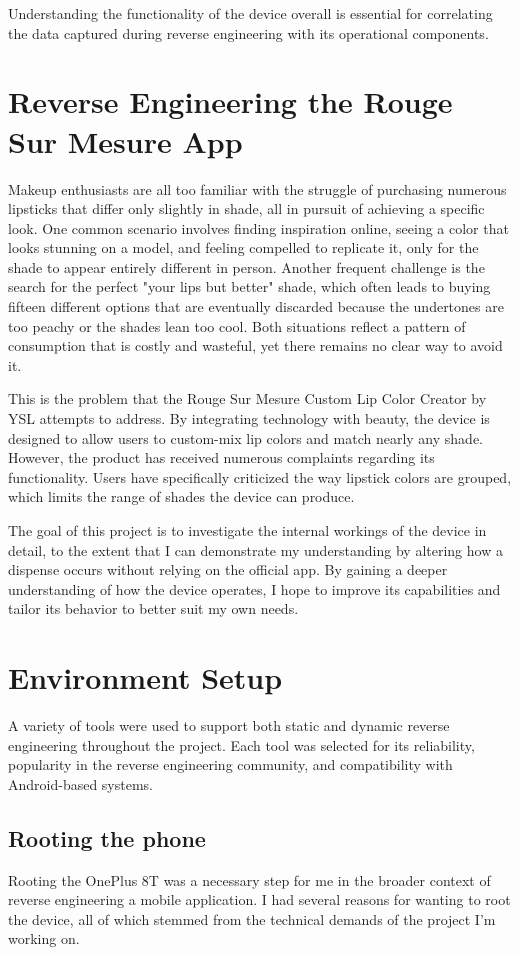 Understanding the functionality of the device overall is essential for correlating the data captured during reverse engineering with its operational components.

\section{Reverse Engineering the Rouge Sur Mesure App}

Makeup enthusiasts are all too familiar with the struggle of purchasing numerous lipsticks that differ only slightly in shade, all in pursuit of achieving a specific look. One common scenario involves finding inspiration online, seeing a color that looks stunning on a model, and feeling compelled to replicate it, only for the shade to appear entirely different in person. Another frequent challenge is the search for the perfect "your lips but better" shade, which often leads to buying fifteen different options that are eventually discarded because the undertones are too peachy or the shades lean too cool. Both situations reflect a pattern of consumption that is costly and wasteful, yet there remains no clear way to avoid it.

This is the problem that the Rouge Sur Mesure Custom Lip Color Creator by YSL attempts to address. By integrating technology with beauty, the device is designed to allow users to custom-mix lip colors and match nearly any shade. However, the product has received numerous complaints regarding its functionality. Users have specifically criticized the way lipstick colors are grouped, which limits the range of shades the device can produce.

The goal of this project is to investigate the internal workings of the device in detail, to the extent that I can demonstrate my understanding by altering how a dispense occurs without relying on the official app. By gaining a deeper understanding of how the device operates, I hope to improve its capabilities and tailor its behavior to better suit my own needs.

\section{Environment Setup}
A variety of tools were used to support both static and dynamic reverse engineering 
throughout the project. Each tool was selected for its reliability, popularity in the reverse engineering community, and compatibility with Android-based systems.


\subsection{Rooting the phone}
Rooting the OnePlus 8T was a necessary step for me in the broader context of reverse engineering a mobile application. I had several reasons for wanting to root the device, all of which stemmed from the technical demands of the project I’m working on.

